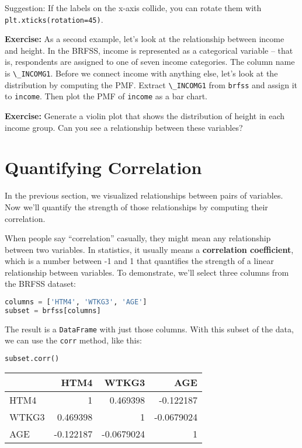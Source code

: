 Suggestion: If the labels on the x-axis collide, you can rotate them
with \passthrough{\lstinline!plt.xticks(rotation=45)!}.

\textbf{Exercise:} As a second example, let's look at the relationship
between income and height. In the BRFSS, income is represented as a
categorical variable -- that is, respondents are assigned to one of
seven income categories. The column name is
\passthrough{\lstinline!\_INCOMG1!}. Before we connect income with
anything else, let's look at the distribution by computing the PMF.
Extract \passthrough{\lstinline!\_INCOMG1!} from
\passthrough{\lstinline!brfss!} and assign it to
\passthrough{\lstinline!income!}. Then plot the PMF of
\passthrough{\lstinline!income!} as a bar chart.

\textbf{Exercise:} Generate a violin plot that shows the distribution of
height in each income group. Can you see a relationship between these
variables?

\section{Quantifying Correlation}\label{quantifying-correlation}

In the previous section, we visualized relationships between pairs of
variables. Now we'll quantify the strength of those relationships by
computing their correlation.

When people say ``correlation'' casually, they might mean any
relationship between two variables. In statistics, it usually means a
\textbf{correlation coefficient}, which is a number between -1 and 1
that quantifies the strength of a linear relationship between variables.
To demonstrate, we'll select three columns from the BRFSS dataset:

\begin{lstlisting}[language=Python,style=source]
columns = ['HTM4', 'WTKG3', 'AGE']
subset = brfss[columns]
\end{lstlisting}

The result is a \passthrough{\lstinline!DataFrame!} with just those
columns. With this subset of the data, we can use the
\passthrough{\lstinline!corr!} method, like this:

\begin{lstlisting}[language=Python,style=source]
subset.corr()
\end{lstlisting}

\begin{tabular}{lrrr}
\midrule
 & HTM4 & WTKG3 & AGE \\
\midrule
HTM4 & 1 & 0.469398 & -0.122187 \\
WTKG3 & 0.469398 & 1 & -0.0679024 \\
AGE & -0.122187 & -0.0679024 & 1 \\
\midrule
\end{tabular}

